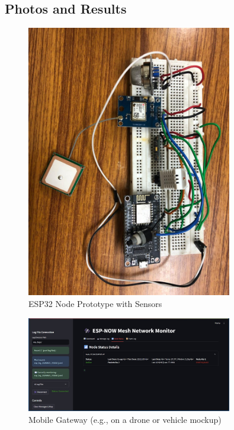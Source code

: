 \documentclass[12pt, a4paper]{article}
\begin{document}
\subsection{Photos and Results}
\begin{figure}[H]
    \centering
    \includegraphics[width=0.8\textwidth]{prototype.jpg} %
    \caption{ESP32 Node Prototype with Sensors}
    \label{fig:prototype_1}
\end{figure}

\begin{figure}[H]
    \centering
    \includegraphics[width=0.8\textwidth]{prototype2.jpg} %
    \caption{Mobile Gateway (e.g., on a drone or vehicle mockup)}
    \label{fig:prototype_2}
\end{figure}
\end{document}
